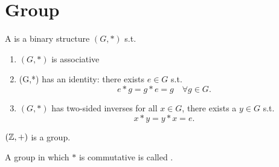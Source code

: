 \documentclass[class=article,crop=false]{standalone}
\begin{document}
\section{Group}
\begin{defn}[group]
	A  is a binary structure $(G,*)$ s.t. 
	\begin{enumerate}[label=\arabic*)]
		\item $(G,*)$ is associative
		\item (G,*) has an identity: there exists  $e \in G$ s.t.
			\[
			e*g=g*e=g \quad \forall g \in G
			.\] 
		\item $(G,*)$ has two-sided inverses for all $x \in G$, there exists a $y \in G$ s.t. \[
		x*y=y*x=e
		.\] 
	\end{enumerate}
\end{defn}

\begin{eg}[]
	$(\mathbb{Z},+)$ is a group. 
\end{eg}

\begin{defn}
A group in which $*$ is commutative is called  . 
\end{defn}
\end{document}
